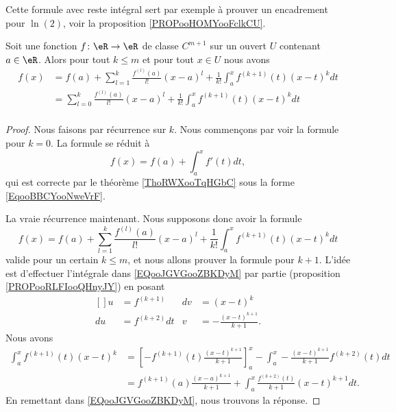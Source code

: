 Cette formule avec reste intégral sert par exemple à prouver un encadrement pour \( \ln(2)\), voir la proposition \ref{PROPooHOMYooFclkCU}.


\begin{proposition}\label{PROPooWGWKooYydpFg}
	Soit une fonction \(f \colon \eR\to \eR  \) de classe \( C^{m+1}\) sur un ouvert \( U\) contenant \( a\in \eR\). Alors pour tout \( k\leq m\) et pour tout \( x\in U\) nous avons
	\begin{subequations}
		\begin{align}
			f(x) & =f(a)+\sum_{l=1}^k\frac{ f^{(l)}(a) }{ l! }(x-a)^l+\frac{1}{ k!}\int_a^xf^{(k+1)}(t)(x-t)^kdt \\
			     & =\sum_{l=0}^k\frac{ f^{(l)}(a) }{ l! }(x-a)^l+\frac{1}{ k!}\int_a^xf^{(k+1)}(t)(x-t)^kdt      \\
		\end{align}
	\end{subequations}
\end{proposition}

\begin{proof}
	Nous faisons par récurrence sur \( k\). Nous commençons par voir la formule pour \( k=0\). La formule se réduit à
	\begin{equation}
		f(x)=f(a)+\int_a^xf'(t)dt,
	\end{equation}
	qui est correcte par le théorème \ref{ThoRWXooTqHGbC} sous la forme \eqref{EqooBBCYooNweVrF}.


	La vraie récurrence maintenant. Nous supposons donc avoir la formule
	\begin{equation}		\label{EQooJGVGooZBKDyM}
		f(x)=f(a)+\sum_{l=1}^k\frac{ f^{(l)}(a) }{ l! }(x-a)^l+\frac{1}{ k!}\int_a^xf^{(k+1)}(t)(x-t)^kdt
	\end{equation}
	valide pour un certain \( k\leq m\), et nous allons prouver la formule pour \( k+1\). L'idée est d'effectuer l'intégrale dans \eqref{EQooJGVGooZBKDyM} par partie (proposition \ref{PROPooRLFIooQHnyJY}) en posant
	\begin{equation}
		\begin{aligned}[]
			u  & =f^{(k+1)}   & dv & =(x-t)^k                       \\
			du & =f^{(k+2)}dt & v  & =-\frac{ (x-t)^{k+1} }{ k+1 }.
		\end{aligned}
	\end{equation}
	Nous avons
	\begin{subequations}
		\begin{align}
			\int_a^xf^{(k+1)}(t)(x-t)^k & =\left[  -f^{(k+1)}(t)\frac{ (x-t)^{k+1} }{ k+1 }   \right]_a^x-\int_a^x-\frac{ (x-t)^{k+1} }{ k+1 }f^{(k+2)}(t)dt \\
			                            & = f^{(k+1)}(a)\frac{ (x-a)^{k+1} }{ k+1 }+\int_a^x\frac{ f^{(k+2)}(t) }{ k+1 }(x-t)^{k+1}dt.
		\end{align}
	\end{subequations}
	En remettant dans \eqref{EQooJGVGooZBKDyM}, nous trouvons la réponse.
\end{proof}

